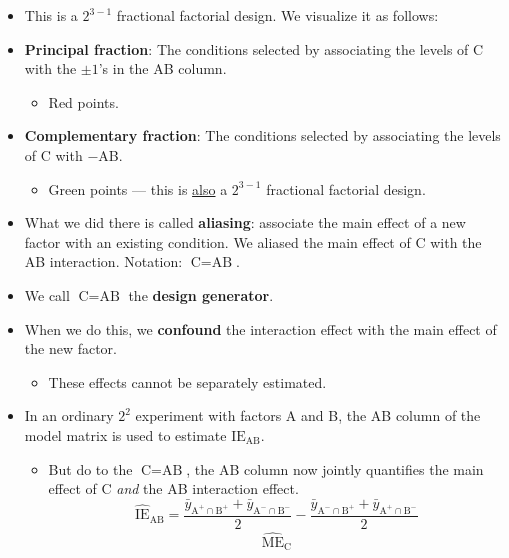 \begin{itemize}
    \item This is a $ 2^{3-1} $ fractional factorial design. We visualize it as follows:
    \item \textbf{Principal fraction}: The conditions selected by associating the levels of C with the $±1$'s in the AB
          column.
          \begin{itemize}[label={}]
              \item Red points.
          \end{itemize}
    \item \textbf{Complementary fraction}: The conditions selected by associating the levels of C with $ - $AB\@.
          \begin{itemize}[label={}]
              \item Green points --- this is \underline{also} a $ 2^{3-1} $ fractional factorial design.
          \end{itemize}
    \item What we did there is called \textbf{aliasing}: associate the main effect of a new
          factor with an existing condition. We aliased the main effect of C with the AB interaction.
          Notation: $ \text{C}=\text{AB} $.
    \item We call $ \text{C}=\text{AB} $ the \textbf{design generator}.
    \item When we do this, we \textbf{confound} the interaction effect with the main effect of the new factor.
          \begin{itemize}[$\hookrightarrow$]
              \item These effects cannot be separately estimated.
          \end{itemize}
    \item In an ordinary $2^2$ experiment with factors A and B, the AB column of the model matrix is used to
          estimate $ \text{IE}_{\text{AB}} $.
          \begin{itemize}
              \item But do to the $ \text{C}=\text{AB} $, the AB column now jointly quantifies the main effect of C \emph{and}
                    the AB interaction effect.
                    \[ \widehat{\text{IE}}_{\text{AB}}
                        =\frac{\bar{y}_{\text{A}^+\cap \text{B}^+}+\bar{y}_{\text{A}^-\cap \text{B}^-}}{2}-\frac{\bar{y}_{\text{A}^-\cap \text{B}^+}+\bar{y}_{\text{A}^+\cap \text{B}^-}}{2} \]
                    \begin{align*}
                        \widehat{\text{ME}}_{\text{C}}

\end{align*}
\end{itemize}
\end{itemize}
